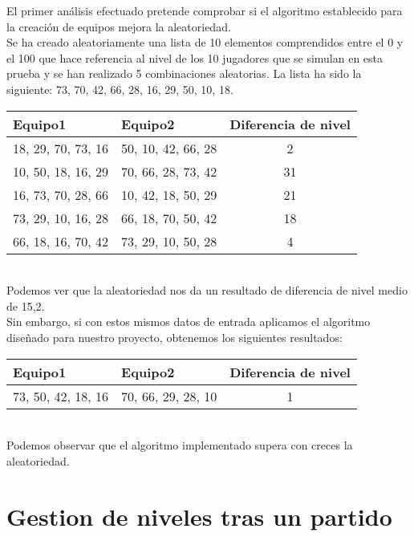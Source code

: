 El primer análisis efectuado pretende comprobar si el algoritmo establecido para la creación de equipos mejora la aleatoriedad.\\

Se ha creado aleatoriamente una lista de 10 elementos comprendidos entre el 0 y el 100 que hace referencia al nivel de los 10 jugadores
que se simulan en esta prueba y se han realizado 5 combinaciones aleatorias. La lista ha sido la siguiente:  73, 70, 42, 66, 28, 16, 29, 50, 10, 18.\\


\begin{tabular}{| l | l | c |}
    \hline
    \textbf{Equipo1} & \textbf{Equipo2} & \textbf{Diferencia de nivel}\\
    \hline
    18, 29, 70, 73, 16 & 50, 10, 42, 66, 28 & 2\\
    \hline
    10, 50, 18, 16, 29 & 70, 66, 28, 73, 42 & 31\\
    \hline
    16, 73, 70, 28, 66 & 10, 42, 18, 50, 29 & 21\\
    \hline
    73, 29, 10, 16, 28 & 66, 18, 70, 50, 42 & 18\\
    \hline
    66, 18, 16, 70, 42 & 73, 29, 10, 50, 28 & 4\\
    \hline
\end{tabular}\\


Podemos ver que la aleatoriedad nos da un resultado de diferencia de nivel medio de 15,2.\\

Sin embargo, si con estos mismos datos de entrada aplicamos el algoritmo diseñado para nuestro proyecto, obtenemos los siguientes resultados:\\

\begin{tabular}{| l | l | c |}
    \hline
    \textbf{Equipo1} & \textbf{Equipo2} & \textbf{Diferencia de nivel}\\
    \hline
    73, 50, 42, 18, 16 & 70, 66, 29, 28, 10 & 1\\
    \hline
\end{tabular}\\

Podemos observar que el algoritmo implementado supera con creces la aleatoriedad.

\section{Gestion de niveles tras un partido}

